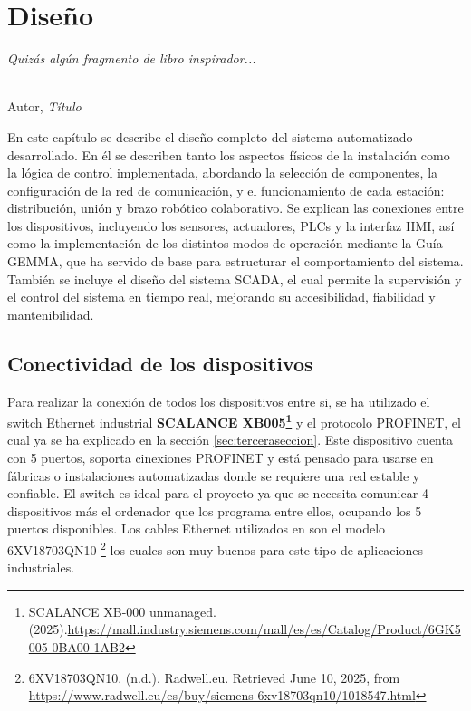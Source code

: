 \chapter{Diseño}
\label{cap:capitulo4}

\begin{flushright}
\begin{minipage}[]{10cm}
\emph{Quizás algún fragmento de libro inspirador...}\\
\end{minipage}\\

Autor, \textit{Título}\\
\end{flushright}

\vspace{1cm}

En este capítulo se describe el diseño completo del sistema automatizado desarrollado. En él se describen tanto los aspectos físicos de la instalación como la lógica de control implementada, abordando la selección de componentes, la configuración de la red de comunicación, y el funcionamiento de cada estación: distribución, unión y brazo robótico colaborativo. Se explican las conexiones entre los dispositivos, incluyendo los sensores, actuadores, PLCs y la interfaz HMI, así como la implementación de los distintos modos de operación mediante la Guía GEMMA, que ha servido de base para estructurar el comportamiento del sistema. También se incluye el diseño del sistema SCADA, el cual permite la supervisión y el control del sistema en tiempo real, mejorando su accesibilidad, fiabilidad y mantenibilidad.


\section{Conectividad de los dispositivos}
\label{sec:conectividad_dispositivos}

Para realizar la conexión de todos los dispositivos entre si, se ha utilizado el switch Ethernet industrial \textbf{SCALANCE XB005\footnote{SCALANCE XB-000 unmanaged. (2025).\url{https://mall.industry.siemens.com/mall/es/es/Catalog/Product/6GK5005-0BA00-1AB2}}} y el protocolo PROFINET, el cual ya se ha explicado en la sección \ref{sec:terceraseccion}. Este dispositivo cuenta con 5 puertos, soporta cinexiones PROFINET y está pensado para usarse en fábricas o instalaciones automatizadas donde se requiere una red estable y confiable. El switch es ideal para el proyecto ya que se necesita comunicar 4 dispositivos más el ordenador que los programa entre ellos, ocupando los 5 puertos disponibles. Los cables Ethernet utilizados en son el modelo 6XV18703QN10 \footnote{6XV18703QN10. (n.d.). Radwell.eu. Retrieved June 10, 2025, from \url{https://www.radwell.eu/es/buy/siemens-6xv18703qn10/1018547.html}} los cuales son muy buenos para este tipo de aplicaciones industriales.  \\


